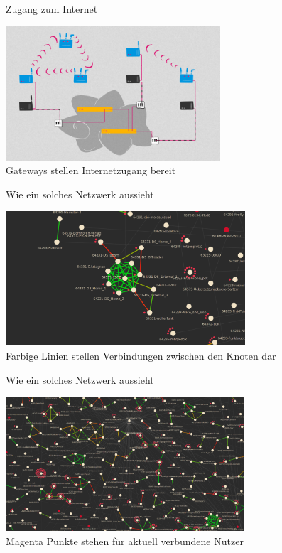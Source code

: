 \documentclass[10pt]{beamer}
\begin{document}
  \begin{frame}{Zugang zum Internet}
    \begin{center}
      \includegraphics[height=5cm]{images/network_5}\\
      \vspace{1em}
      Gateways stellen Internetzugang bereit
      \vspace{1em}
    \end{center}
  \end{frame}

  \begin{frame}{Wie ein solches Netzwerk aussieht}
    \begin{center}
      \includegraphics[height=5cm]{images/mesh_small}\\
      \vspace{1em}
      Farbige Linien stellen Verbindungen zwischen den Knoten dar
      \vspace{1em}
    \end{center}
  \end{frame}

  \begin{frame}{Wie ein solches Netzwerk aussieht}
    \begin{center}
      \includegraphics[height=5cm]{images/mesh_medium}\\
      \vspace{1em}
      Magenta Punkte stehen für aktuell verbundene Nutzer
      \vspace{1em}
    \end{center}
  \end{frame}
\end{document}
